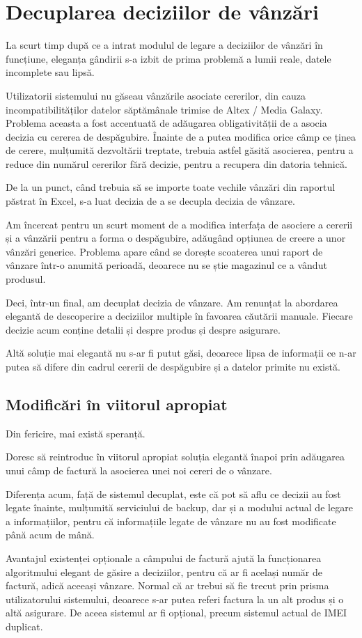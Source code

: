 \section{Decuplarea deciziilor de vânzări}

	La scurt timp după ce a intrat modulul de legare a deciziilor de vânzări în funcțiune, eleganța gândirii s-a izbit de prima problemă a lumii reale, datele incomplete sau lipsă.

	Utilizatorii sistemului nu găseau vânzările asociate cererilor, din cauza incompatibilităților datelor săptămânale trimise de Altex / Media Galaxy.
	Problema aceasta a fost accentuată de adăugarea obligativității de a asocia decizia cu cererea de despăgubire.
	Înainte de a putea modifica orice câmp ce ținea de cerere, mulțumită dezvoltării treptate, trebuia astfel găsită asocierea, pentru a reduce din numărul cererilor fără decizie, pentru a recupera din datoria tehnică.

	De la un punct, când trebuia să se importe toate vechile vânzări din raportul păstrat în Excel, s-a luat decizia de a se decupla decizia de vânzare.

	Am încercat pentru un scurt moment de a modifica interfața de asociere a cererii și a vânzării pentru a forma o despăgubire, adăugând opțiunea de creere a unor vânzări generice.
	Problema apare când se dorește scoaterea unui raport de vânzare într-o anumită perioadă, deoarece nu se știe magazinul ce a vândut produsul.

	Deci, într-un final, am decuplat decizia de vânzare.
	Am renunțat la abordarea elegantă de descoperire a deciziilor multiple în favoarea căutării manuale.
	Fiecare decizie acum conține detalii și despre produs și despre asigurare.

	Altă soluție mai elegantă nu s-ar fi putut găsi, deoarece lipsa de informații ce n-ar putea să difere din cadrul cererii de despăgubire și a datelor primite nu există.

	\subsection{Modificări în viitorul apropiat}

	Din fericire, mai există speranță.

	Doresc să reintroduc în viitorul apropiat soluția elegantă înapoi prin adăugarea unui câmp de factură la asocierea unei noi cereri de o vânzare.

	Diferența acum, față de sistemul decuplat, este că pot să aflu ce decizii au fost legate înainte, mulțumită serviciului de backup, dar și a modului actual de legare a informațiilor, pentru că informațiile legate de vânzare nu au fost modificate până acum de mână.

	Avantajul existenței opționale a câmpului de factură ajută la funcționarea algoritmului elegant de găsire a deciziilor, pentru că ar fi același număr de factură, adică aceeași vânzare.
	Normal că ar trebui să fie trecut prin prisma utilizatorului sistemului, deoarece s-ar putea referi factura la un alt produs și o altă asigurare.
	De aceea sistemul ar fi opțional, precum sistemul actual de IMEI duplicat.

